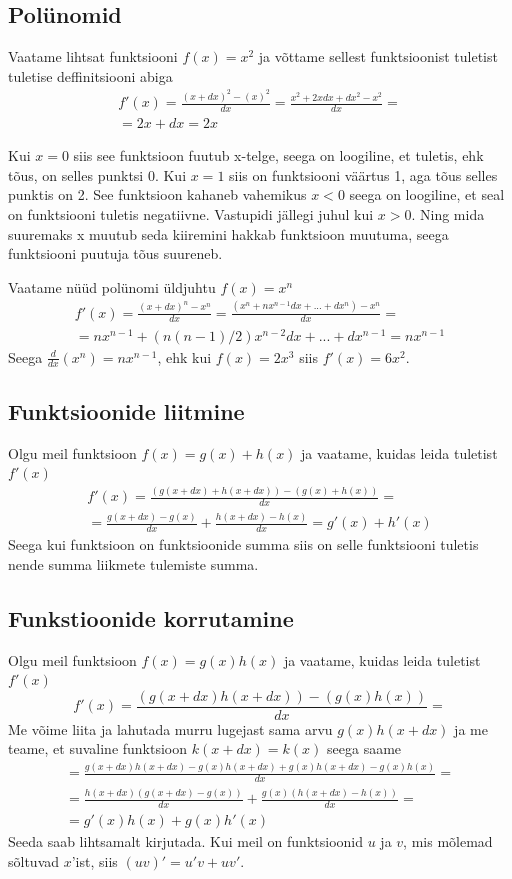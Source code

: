 \documentclass[a4paper,11pt,twocolumn]{article}
\begin{document}
\subsection{Polünomid}
Vaatame lihtsat funktsiooni $f(x) = x^2$ ja võttame sellest funktsioonist tuletist tuletise deffinitsiooni abiga
\begin{multline*}
f'(x) = \frac{(x+dx)^2-(x)^2}{dx} = \frac{x^2 + 2xdx + dx^2 - x^2}{dx} = \\
= 2x + dx = 2x
\end{multline*}

Kui $x=0$ siis see funktsioon fuutub x-telge, seega on loogiline, et tuletis, ehk tõus, on selles punktsi 0. Kui $x=1$ siis on funktsiooni väärtus 1, aga tõus selles punktis on 2. See funktsioon kahaneb vahemikus $x<0$ seega on loogiline, et seal on funktsiooni tuletis negatiivne. Vastupidi jällegi juhul kui $x>0$. Ning mida suuremaks x muutub seda kiiremini hakkab funktsioon muutuma, seega funktsiooni puutuja tõus suureneb.

Vaatame nüüd polünomi üldjuhtu $f(x) = x^n$
\begin{multline*}
f'(x) = \frac{(x+dx)^n-x^n}{dx} = \frac{(x^n+nx^{n-1}dx+...+dx^n)-x^n}{dx}= \\
=nx^{n-1}+(n(n-1)/2)x^{n-2}dx+...+dx^{n-1}= nx^{n-1}
\end{multline*}
Seega $\frac{d}{dx}(x^n)=nx^{n-1}$, ehk kui $f(x)=2x^3$ siis $f'(x)=6x^2$.

\subsection{Funktsioonide liitmine}
Olgu meil funktsioon $f(x) = g(x) + h(x)$ ja vaatame, kuidas leida tuletist $f'(x)$
\begin{multline*}
f'(x) = \frac{(g(x+dx)+h(x+dx))-(g(x)+h(x))}{dx} = \\
= \frac{g(x+dx) - g(x)}{dx} + \frac{h(x+dx) - h(x)}{dx} = g'(x) + h'(x)
\end{multline*}
Seega kui funktsioon on funktsioonide summa siis on selle funktsiooni tuletis nende summa liikmete tulemiste summa.

\subsection{Funkstioonide korrutamine}
Olgu meil funktsioon $f(x) = g(x)h(x)$ ja vaatame, kuidas leida tuletist $f'(x)$
\begin{equation*}
f'(x) = \frac{(g(x+dx)h(x+dx)) - (g(x)h(x))}{dx} = 
\end{equation*}
Me võime liita ja lahutada murru lugejast sama arvu $g(x)h(x+dx)$ ja me teame, et suvaline funktsioon $k(x+dx) = k(x)$ seega saame
\begin{multline*}
= \frac{g(x+dx)h(x+dx) - g(x)h(x+dx) + g(x)h(x+dx) - g(x)h(x)}{dx} = \\
= \frac{h(x+dx)(g(x+dx)-g(x))}{dx} + \frac{g(x)(h(x+dx)-h(x))}{dx} = \\
= g'(x)h(x) + g(x)h'(x)
\end{multline*}
Seeda saab lihtsamalt kirjutada. Kui meil on funktsioonid $u$ ja $v$, mis mõlemad sõltuvad $x$'ist, siis $(uv)' = u'v + uv'$.
\end{document}
